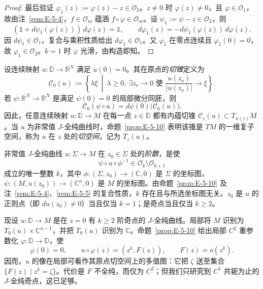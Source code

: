 \begin{proof}
最后验证 $\varphi_1(z):=\varphi(z)-z\in\mathcal O_2$。$z\ne0$ 时 $\varphi(z)\ne0$，且 $\varphi\in\mathcal O_1$，故由注~\ref{rem:E-5-4}，$f\in\mathcal O_m$ 蕴涵 $f\circ\varphi\in\mathcal O_m$。设 $\psi_1:=\psi-z\in\mathcal O_2$，则
\[
  (\mathbb 1+d\psi_1(\varphi(z)))\,d\varphi(z)=\mathbb 1,
  \qquad
  d\varphi_1(z)=-d\psi_1(\varphi(z))\,d\varphi(z).
\]
因 $d\psi_1\in\mathcal O_1$，复合与乘积性质给出 $d\varphi_1\in\mathcal O_1$。又 $\varphi_1$ 在零点连续且 $\varphi_1(0)=0$，故 $\varphi_1\in\mathcal O_2$。$k=1$ 时 $\varphi$ 光滑，由构造即知。
\end{proof}

\begin{remark}\label{rem:E-5-11}
设连续映射 $u:\mathbb D\to\mathbb R^N$ 满足 $u(0)=0$。其在原点的\emph{切锥}定义为
\[
  \mathcal C_0(u):=\left\{\lambda\xi\ \middle|\ \lambda\ge0,
  \ \exists z_\nu\to0\text{ 使 }
  \frac{u(z_\nu)}{|u(z_\nu)|}\to\xi\right\}.
\]
若 $\psi:\mathbb R^N\to\mathbb R^N$ 是满足 $\psi(0)=0$ 的局部微分同胚，则
\[
  \mathcal C_0(\psi\circ u)=d\psi(0)\bigl(\mathcal C_0(u)\bigr).
\]
因此，任意连续映射 $u:\mathbb D\to M$ 在每一点 $z\in\mathbb D$ 都有内蕴切锥 $\mathcal C_z(u)\subset T_{u(z)}M$。当 $u$ 为非常值 $J$-全纯曲线时，命题~\ref{prop:E-5-10} 表明该锥是 $TM$ 的一维复子空间，称为 $u$ 在 $z$ 处的\emph{切空间}，记为 $T_z(u)$。

非常值 $J$-全纯曲线 $u:\Sigma\to M$ 在 $z_0\in\Sigma$ 处的\emph{阶数}，是使
\[
  \psi\circ u\circ\phi^{-1}\in
  \mathcal O_k\setminus\mathcal O_{k+1}
\]
成立的唯一整数 $k$，其中 $\phi:(\Sigma,z_0)\to(\mathbb C,0)$ 是 $\Sigma$ 的坐标图，$\psi:(M,u(z_0))\to(\mathbb C^n,0)$ 是 $M$ 的坐标图。由命题~\ref{prop:E-5-10} 及注~\ref{rem:E-5-4}、\ref{rem:E-5-5} 的复合性质，$k$ 存在且与所选坐标图无关。$z_0$ 是 $u$ 的正则点（即 $du(z_0)\ne0$）当且仅当 $k=1$；是奇点当且仅当 $k\ge2$。

现设 $u:\mathbb D\to M$ 是在 $z=0$ 有 $k\ge2$ 阶奇点的 $J$-全纯曲线。局部将 $M$ 识别为 $T_0(u)\times\mathbb C^{n-1}$，并把 $T_0(u)$ 识别为 $\mathbb C$。命题~\ref{prop:E-5-10} 给出局部 $C^2$ 重参数化 $\varphi:\mathbb D\to\mathbb D$，使
\[
  \varphi(0)=0,\qquad u\circ\varphi(z)=(z^k,F(z)),
  \qquad F(z)=o(z^k).
\]
因而，$u$ 的像在局部可看作其原点切空间上的多值图：它把 $\zeta$ 送至集合 $\{F(z)\mid z^k=\zeta\}$。代价是 $F$ 不全纯，而仅为 $C^2$；但我们只研究到 $C^1$ 共轭为止的 $J$-全纯奇点，这已足够。
\end{remark}
